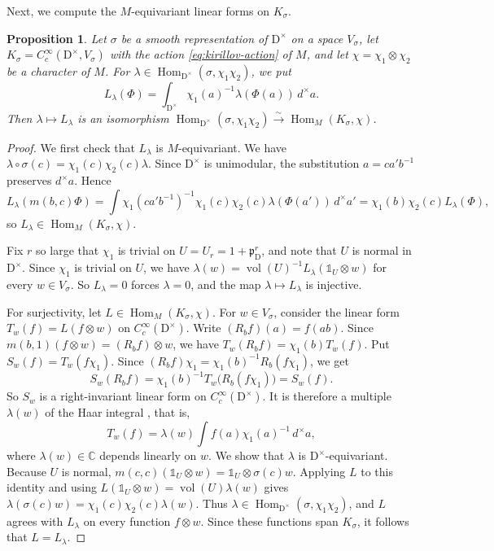 \documentclass[11pt]{amsart}
\numberwithin{equation}{section}
\theoremstyle{plain}
\newtheorem{proposition}[theorem]{Proposition}
\theoremstyle{definition}
\theoremstyle{remark}
\newcommand{\C}{\mathbb{C}}
\newcommand{\one}{\mathds{1}}
\DeclareMathOperator{\Hom}{Hom}
\DeclareMathOperator{\vol}{vol}
\begin{document}
Next, we compute the $M$-equivariant linear forms on $K_\sigma$.

\begin{proposition}\label{prop:kirillov-frobenius}
	Let $\sigma$ be a smooth representation of $\mathrm{D}^\times$ on a space $V_\sigma$, let $K_\sigma=C_c^\infty(\mathrm{D}^\times,V_\sigma)$ with the action \eqref{eq:kirillov-action} of $M$, and let $\chi=\chi_1\otimes\chi_2$ be a character of $M$. For $\lambda\in\Hom_{\mathrm{D}^\times}(\sigma,\chi_1\chi_2)$, we put
	\[
	L_\lambda(\Phi)=\int_{\mathrm{D}^\times}\chi_1(a)^{-1}\lambda(\Phi(a))\,d^\times a .
	\]
	Then $\lambda\mapsto L_\lambda$ is an isomorphism $\Hom_{\mathrm{D}^\times}(\sigma,\chi_1\chi_2)\xrightarrow{\sim}\Hom_M(K_\sigma,\chi)$.
\end{proposition}

\begin{proof}
	We first check that $L_\lambda$ is $M$-equivariant. We have $\lambda\circ\sigma(c)=\chi_1(c)\chi_2(c)\lambda$. Since $\mathrm{D}^\times$ is unimodular, the substitution $a=ca'b^{-1}$ preserves $d^\times a$. Hence
	\[
	L_\lambda(m(b,c)\Phi)=\int\chi_1(ca'b^{-1})^{-1}\chi_1(c)\chi_2(c)\lambda(\Phi(a'))\,d^\times a'=\chi_1(b)\chi_2(c)L_\lambda(\Phi),
	\]
	so $L_\lambda\in\Hom_M(K_\sigma,\chi)$.
	
	Fix $r$ so large that $\chi_1$ is trivial on $U=U_r=1+\mathfrak p_{\mathrm{D}}^r$, and note that $U$ is normal in $\mathrm{D}^\times$. Since $\chi_1$ is trivial on $U$, we have $\lambda(w)=\vol(U)^{-1}L_\lambda(\one_U\otimes w)$ for every $w\in V_\sigma$. So $L_\lambda=0$ forces $\lambda=0$, and the map $\lambda\mapsto L_\lambda$ is injective.
	
	For surjectivity, let $L\in\Hom_M(K_\sigma,\chi)$. For $w\in V_\sigma$, consider the linear form $T_w(f)=L(f\otimes w)$ on $C_c^\infty(\mathrm{D}^\times)$. Write $(R_bf)(a)=f(ab)$. Since $m(b,1)(f\otimes w)=(R_bf)\otimes w$, we have $T_w(R_bf)=\chi_1(b)T_w(f)$. Put $S_w(f)=T_w(f\chi_1)$. Since $(R_bf)\chi_1=\chi_1(b)^{-1}R_b(f\chi_1)$, we get
	\[
	S_w(R_bf)=\chi_1(b)^{-1}T_w\big(R_b(f\chi_1)\big)=S_w(f).
	\]
	So $S_w$ is a right-invariant linear form on $C_c^\infty(\mathrm{D}^\times)$. It is therefore a multiple $\lambda(w)$ of the Haar integral \cite[\S1.18]{BZ76}, that is,
	\[
	T_w(f)=\lambda(w)\int f(a)\chi_1(a)^{-1}\,d^\times a,
	\]
	where $\lambda(w)\in\C$ depends linearly on $w$. We show that $\lambda$ is $\mathrm{D}^\times$-equivariant. Because $U$ is normal, $m(c,c)(\one_U\otimes w)=\one_U\otimes\sigma(c)w$. Applying $L$ to this identity and using $L(\one_U\otimes w)=\vol(U)\lambda(w)$ gives $\lambda(\sigma(c)w)=\chi_1(c)\chi_2(c)\lambda(w)$. Thus $\lambda\in\Hom_{\mathrm{D}^\times}(\sigma,\chi_1\chi_2)$, and $L$ agrees with $L_\lambda$ on every function $f\otimes w$. Since these functions span $K_\sigma$, it follows that $L=L_\lambda$.
\end{proof}
\end{document}
